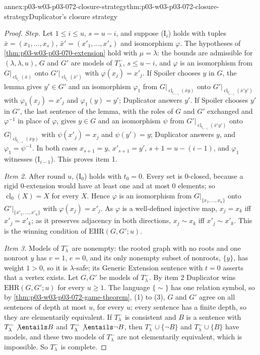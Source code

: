 \begin{annexitem}{annex:p03-w03-p03-072-closure-strategy}{thm:p03-w03-p03-072-closure-strategy}{Duplicator's closure strategy}
\begin{proof}
\emph{Step.}  Let \(1\leq i\leq u\), \(s=u-i\), and suppose (I\(_i\)) holds
with tuples \(\bar x=(x_1,\ldots,x_s)\), \(\bar x'=(x'_1,\ldots,x'_s)\) and
isomorphism \(\varphi\).  The hypotheses of
\cref{thm:p03-w03-p03-070-extension} hold with \(\mu=\lambda\): the bounds
are admissible for \((\lambda,\lambda,u)\), \(G\) and \(G'\) are models of
\(T^-_\lambda\), \(s\leq u-i\), and \(\varphi\) is an isomorphism from
\(G|_{\operatorname{cl}_{t_i}(\bar x)}\) onto
\(G'|_{\operatorname{cl}_{t_i}(\bar x')}\) with \(\varphi(x_j)=x'_j\).  If
Spoiler chooses \(y\) in \(G\), the lemma gives \(y'\in G'\) and an
isomorphism \(\varphi_1\) from
\(G|_{\operatorname{cl}_{t_{i-1}}(\bar xy)}\) onto
\(G'|_{\operatorname{cl}_{t_{i-1}}(\bar x'y')}\) with
\(\varphi_1(x_j)=x'_j\) and \(\varphi_1(y)=y'\); Duplicator answers \(y'\).
If Spoiler chooses \(y'\) in \(G'\), the last sentence of the lemma, with the
roles of \(G\) and \(G'\) exchanged and \(\varphi^{-1}\) in place of
\(\varphi\), gives \(y\in G\) and an isomorphism \(\psi\) from
\(G'|_{\operatorname{cl}_{t_{i-1}}(\bar x'y')}\) onto
\(G|_{\operatorname{cl}_{t_{i-1}}(\bar xy)}\) with \(\psi(x'_j)=x_j\) and
\(\psi(y')=y\); Duplicator answers \(y\), and \(\varphi_1=\psi^{-1}\).  In both
cases \(x_{s+1}=y\), \(x'_{s+1}=y'\), \(s+1=u-(i-1)\), and \(\varphi_1\)
witnesses (I\(_{i-1}\)).  This proves item 1.

\emph{Item 2.}  After round \(u\), (I\(_0\)) holds with \(t_0=0\).  Every set
is \(0\)-closed, because a rigid \(0\)-extension would have at least one and
at most \(0\) elements; so \(\operatorname{cl}_0(X)=X\) for every \(X\).
Hence \(\varphi\) is an isomorphism from \(G|_{\{x_1,\ldots,x_u\}}\) onto
\(G'|_{\{x'_1,\ldots,x'_u\}}\) with \(\varphi(x_j)=x'_j\).  As \(\varphi\) is
a well-defined injective map, \(x_j=x_k\) iff \(x'_j=x'_k\); as it preserves
adjacency in both directions, \(x_j\sim x_k\) iff \(x'_j\sim x'_k\).  This is
the winning condition of \(\mathrm{EHR}(G,G';u)\).

\emph{Item 3.}  Models of \(T^-_\lambda\) are nonempty: the rooted graph with
no roots and one nonroot \(y\) has \(v=1\), \(e=0\), and its only nonempty
subset of nonroots, \(\{y\}\), has weight \(1>0\), so it is
\(\lambda\)-safe; its Generic Extension sentence with \(t=0\) asserts that a
vertex exists.  Let \(G,G'\) be models of \(T^-_\lambda\).  By item 2
Duplicator wins \(\mathrm{EHR}(G,G';u)\) for every \(u\geq1\).  The language
\(\{\sim\}\) has one relation symbol, so by
\cref{thm:p03-w03-p03-072-game-theorem}, (1) to (3), \(G\) and \(G'\) agree
on all sentences of depth at most \(u\), for every \(u\); every sentence has
a finite depth, so they are elementarily equivalent.  If \(T^-_\lambda\) is
consistent and \(B\) is a sentence with \(T^-_\lambda\not\entails B\) and
\(T^-_\lambda\not\entails\neg B\), then \(T^-_\lambda\cup\{\neg B\}\) and
\(T^-_\lambda\cup\{B\}\) have models, and these two models of
\(T^-_\lambda\) are not elementarily equivalent, which is impossible.  So
\(T^-_\lambda\) is complete.
\end{proof}
\end{annexitem}

